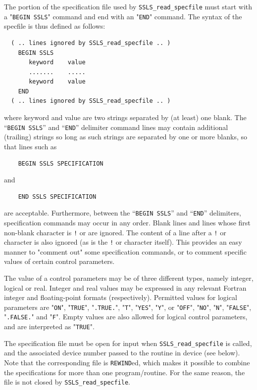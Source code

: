 \documentclass{galahad}
\newcommand{\packagename}{SSLS}
\begin{document}
The portion of the specification file used by
{\tt \packagename\_read\_specfile}
must start
with a "{\tt BEGIN \packagename}" command and end with an
"{\tt END}" command.  The syntax of the specfile is thus defined as follows:
\begin{verbatim}
  ( .. lines ignored by SSLS_read_specfile .. )
    BEGIN SSLS
       keyword    value
       .......    .....
       keyword    value
    END
  ( .. lines ignored by SSLS_read_specfile .. )
\end{verbatim}
where keyword and value are two strings separated by (at least) one blank.
The ``{\tt BEGIN \packagename}'' and ``{\tt END}'' delimiter command lines
may contain additional (trailing) strings so long as such strings are
separated by one or more blanks, so that lines such as
\begin{verbatim}
    BEGIN SSLS SPECIFICATION
\end{verbatim}
and
\begin{verbatim}
    END SSLS SPECIFICATION
\end{verbatim}
are acceptable. Furthermore,
between the
``{\tt BEGIN \packagename}'' and ``{\tt END}'' delimiters,
specification commands may occur in any order.  Blank lines and
lines whose first non-blank character is {\tt !} or {\tt *} are ignored.
The content
of a line after a {\tt !} or {\tt *} character is also
ignored (as is the {\tt !} or {\tt *}
character itself). This provides an easy manner to "comment out" some
specification commands, or to comment specific values
of certain control parameters.

The value of a control parameters may be of three different types, namely
integer, logical or real.
Integer and real values may be expressed in any relevant Fortran integer and
floating-point formats (respectively). Permitted values for logical
parameters are "{\tt ON}", "{\tt TRUE}", "{\tt .TRUE.}", "{\tt T}",
"{\tt YES}", "{\tt Y}", or "{\tt OFF}", "{\tt NO}",
"{\tt N}", "{\tt FALSE}", "{\tt .FALSE.}" and "{\tt F}".
Empty values are also allowed for
logical control parameters, and are interpreted as "{\tt TRUE}".

The specification file must be open for
input when {\tt \packagename\_read\_specfile}
is called, and the associated device number
passed to the routine in device (see below).
Note that the corresponding
file is {\tt REWIND}ed, which makes it possible to combine the specifications
for more than one program/routine.  For the same reason, the file is not
closed by {\tt \packagename\_read\_specfile}.
\end{document}
